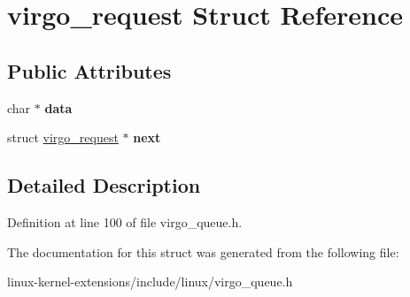 \hypertarget{structvirgo__request}{\section{virgo\-\_\-request Struct Reference}
\label{structvirgo__request}
}
\subsection*{Public Attributes}
\begin{DoxyCompactItemize}
\item 
\hypertarget{structvirgo__request_acad1b2de42892b4de96b0768698479cf}{char $\ast$ {\bfseries data}}\label{structvirgo__request_acad1b2de42892b4de96b0768698479cf}

\item 
\hypertarget{structvirgo__request_ac5b6985271adb8cc850ab389d60f999c}{struct \hyperlink{structvirgo__request}{virgo\-\_\-request} $\ast$ {\bfseries next}}\label{structvirgo__request_ac5b6985271adb8cc850ab389d60f999c}

\end{DoxyCompactItemize}


\subsection{Detailed Description}


Definition at line 100 of file virgo\-\_\-queue.\-h.



The documentation for this struct was generated from the following file\-:\begin{DoxyCompactItemize}
\item 
linux-\/kernel-\/extensions/include/linux/virgo\-\_\-queue.\-h\end{DoxyCompactItemize}
